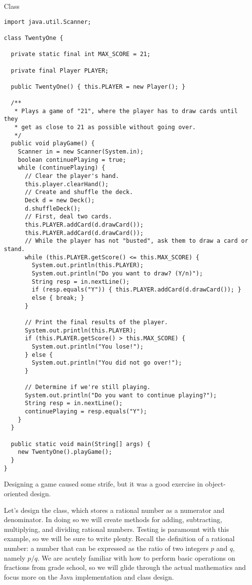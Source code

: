 \begin{cl}{ Class}
\begin{lstlisting}[language=MyJava]
import java.util.Scanner;

class TwentyOne {

  private static final int MAX_SCORE = 21;

  private final Player PLAYER;

  public TwentyOne() { this.PLAYER = new Player(); }

  /**
   * Plays a game of "21", where the player has to draw cards until they
   * get as close to 21 as possible without going over.
   */
  public void playGame() {
    Scanner in = new Scanner(System.in);
    boolean continuePlaying = true;
    while (continuePlaying) {
      // Clear the player's hand.
      this.player.clearHand();
      // Create and shuffle the deck.
      Deck d = new Deck();
      d.shuffleDeck();
      // First, deal two cards.
      this.PLAYER.addCard(d.drawCard());
      this.PLAYER.addCard(d.drawCard());
      // While the player has not "busted", ask them to draw a card or stand.
      while (this.PLAYER.getScore() <= this.MAX_SCORE) {
        System.out.println(this.PLAYER);
        System.out.println("Do you want to draw? (Y/n)");
        String resp = in.nextLine();
        if (resp.equals("Y")) { this.PLAYER.addCard(d.drawCard()); }
        else { break; }
      }

      // Print the final results of the player.
      System.out.println(this.PLAYER);
      if (this.PLAYER.getScore() > this.MAX_SCORE) {
        System.out.println("You lose!");
      } else {
        System.out.println("You did not go over!");
      }

      // Determine if we're still playing.
      System.out.println("Do you want to continue playing?");
      String resp = in.nextLine();
      continuePlaying = resp.equals("Y");
    }
  }

  public static void main(String[] args) {
    new TwentyOne().playGame();
  }
}
\end{lstlisting}
\end{cl}

Designing a game caused some strife, but it was a good exercise in object-oriented design.

\example Let's design the  class, which stores a rational number as a numerator and denominator. In doing so we will create methods for adding, subtracting, multiplying, and dividing rational numbers. Testing is paramount with this example, so we will be sure to write plenty. Recall the definition of a rational number: a number that can be expressed as the ratio of two integers $p$ and $q$, namely $p/q$. We are acutely familiar with how to perform basic operations on fractions from grade school, so we will glide through the actual mathematics and focus more on the Java implementation and class design.


